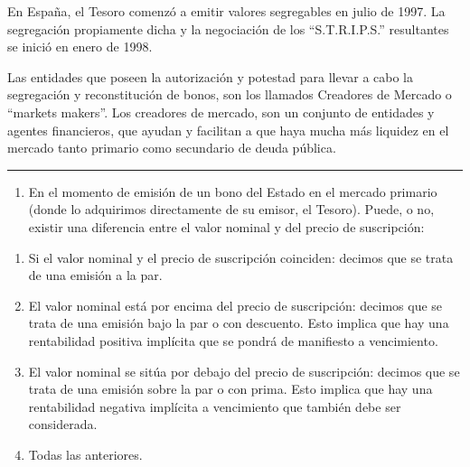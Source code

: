 \documentclass[
  letterpaper,
  DIV=11,
  numbers=noendperiod]{scrreprt}
\providecommand{\tightlist}{%
  \setlength{\itemsep}{0pt}\setlength{\parskip}{0pt}}\usepackage{longtable,booktabs,array}
\begin{document}
\begin{tcolorbox}
\begin{tcolorbox}[enhanced jigsaw, toprule=.15mm, left=2mm, arc=.35mm, breakable, bottomrule=.15mm, opacityback=0, rightrule=.15mm, leftrule=.75mm, colframe=quarto-callout-note-color-frame, colback=white]
\begin{minipage}[t]{\textwidth - 5.5mm}
En España, el Tesoro comenzó a emitir valores segregables en julio de
1997. La segregación propiamente dicha y la negociación de los
``S.T.R.I.P.S.'' resultantes se inició en enero de 1998.

Las entidades que poseen la autorización y potestad para llevar a cabo
la segregación y reconstitución de bonos, son los llamados Creadores de
Mercado o ``markets makers''. Los creadores de mercado, son un conjunto
de entidades y agentes financieros, que ayudan y facilitan a que haya
mucha más liquidez en el mercado tanto primario como secundario de deuda
pública.

\end{minipage}%
\end{tcolorbox}

\begin{center}\rule{0.5\linewidth}{0.5pt}\end{center}

\begin{enumerate}
\def\labelenumi{\arabic{enumi}.}
\setcounter{enumi}{11}
\tightlist
\item
  En el momento de emisión de un bono del Estado en el mercado primario
  (donde lo adquirimos directamente de su emisor, el Tesoro). Puede, o
  no, existir una diferencia entre el valor nominal y del precio de
  suscripción:
\end{enumerate}

\begin{enumerate}
\def\labelenumi{\alph{enumi}.}
\item
  Si el valor nominal y el precio de suscripción coinciden: decimos que
  se trata de una emisión a la par.
\item
  El valor nominal está por encima del precio de suscripción: decimos
  que se trata de una emisión bajo la par o con descuento. Esto implica
  que hay una rentabilidad positiva implícita que se pondrá de
  manifiesto a vencimiento.
\item
  El valor nominal se sitúa por debajo del precio de suscripción:
  decimos que se trata de una emisión sobre la par o con prima. Esto
  implica que hay una rentabilidad negativa implícita a vencimiento que
  también debe ser considerada.
\item
  Todas las anteriores.
\end{enumerate}

\begin{tcolorbox}[enhanced jigsaw, toprule=.15mm, left=2mm, arc=.35mm, breakable, bottomrule=.15mm, opacityback=0, rightrule=.15mm, leftrule=.75mm, colframe=quarto-callout-note-color-frame, colback=white]
\begin{minipage}[t]{5.5mm}
\textcolor{quarto-callout-note-color}{\faInfo}
\end{minipage}%
\begin{minipage}[t]{\textwidth - 5.5mm}


\end{minipage}
\end{tcolorbox}
\end{tcolorbox}
\end{document}
